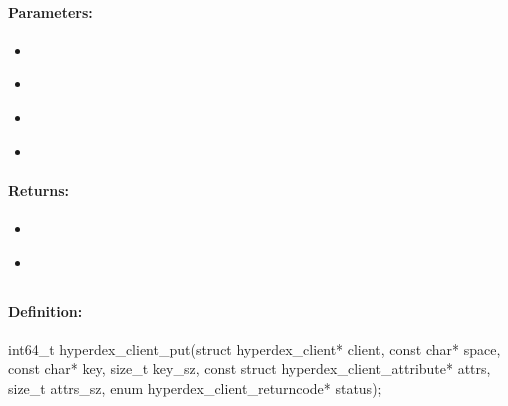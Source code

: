 \paragraph{Parameters:}
\begin{itemize}[noitemsep]
\item {}\\

\item {}\\

\item {}\\

\item {}\\

\end{itemize}

\paragraph{Returns:}
\begin{itemize}[noitemsep]
\item {}\\

\item {}\\

\end{itemize}

\pagebreak
\subsection{}
\label{api:c:put}


\paragraph{Definition:}
\begin{ccode}
int64_t hyperdex_client_put(struct hyperdex_client* client,
        const char* space,
        const char* key, size_t key_sz,
        const struct hyperdex_client_attribute* attrs, size_t attrs_sz,
        enum hyperdex_client_returncode* status);
\end{ccode}

